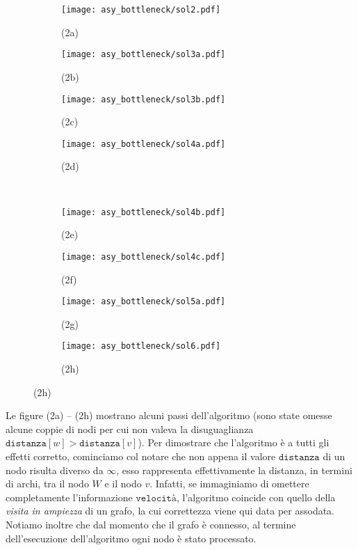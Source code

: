 \begin{figure}[H]
  \begin{subfigure}[c]{0.20\textwidth}
  	\texttt{[image: asy\_bottleneck/sol2.pdf]}
  	\caption{(2a)}
  \end{subfigure}\hfill
  \begin{subfigure}[c]{0.20\textwidth}
\texttt{[image: asy\_bottleneck/sol3a.pdf]}
	\caption{(2b)}
  \end{subfigure}\hfill
  \begin{subfigure}[c]{0.20\textwidth}
\texttt{[image: asy\_bottleneck/sol3b.pdf]}
	\caption{(2c)}
  \end{subfigure}\hfill
  \begin{subfigure}[c]{0.20\textwidth}
\texttt{[image: asy\_bottleneck/sol4a.pdf]}
	\caption{(2d)}
  \end{subfigure}\\[3mm]
  \begin{subfigure}[c]{0.20\textwidth}
\texttt{[image: asy\_bottleneck/sol4b.pdf]}
	\caption{(2e)}
  \end{subfigure}\hfill
  \begin{subfigure}[c]{0.20\textwidth}
\texttt{[image: asy\_bottleneck/sol4c.pdf]}
	\caption{(2f)}
  \end{subfigure}\hfill
  \begin{subfigure}[c]{0.20\textwidth}
\texttt{[image: asy\_bottleneck/sol5a.pdf]}
	\caption{(2g)}
  \end{subfigure}\hfill
  \begin{subfigure}[c]{0.20\textwidth}
\texttt{[image: asy\_bottleneck/sol6.pdf]}
	\caption{(2h)}
  \end{subfigure}
\end{figure}
Le figure (2a) -- (2h) mostrano alcuni passi dell'algoritmo (sono state omesse alcune coppie di nodi per cui non valeva la disuguaglianza $\texttt{distanza}[w] > \texttt{distanza}[v]$). Per dimostrare che l'algoritmo è a tutti gli effetti corretto, cominciamo col notare che non appena il valore $\texttt{distanza}$ di un nodo risulta diverso da $\infty$, esso rappresenta effettivamente la distanza, in termini di archi, tra il nodo $W$ e il nodo $v$. Infatti, se immaginiamo di omettere completamente l'informazione $\texttt{velocità}$, l'algoritmo coincide con quello della \emph{visita in ampiezza} di un grafo, la cui correttezza viene qui data per assodata. Notiamo inoltre che dal momento che il grafo è connesso, al termine dell'esecuzione dell'algoritmo ogni nodo è stato processato.

